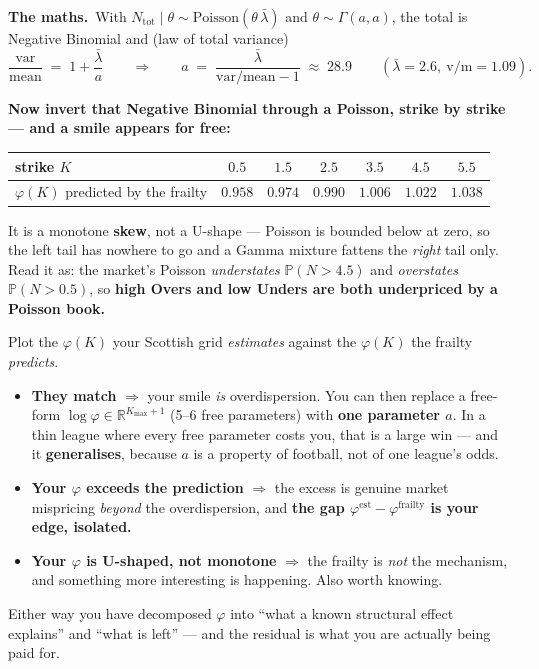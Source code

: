 \documentclass[11pt,a4paper]{article}
\newcommand{\formula}[1]{\smallskip\noindent\textbf{\small The maths.}\ #1}
\begin{document}
\formula{With $N_{\text{tot}} \mid \theta \sim \mathrm{Poisson}(\theta\,\bar\lambda)$ and
$\theta \sim \Gamma(a,a)$, the total is Negative Binomial and (law of total variance)
\[
  \frac{\mathrm{var}}{\mathrm{mean}} \;=\; 1 + \frac{\bar\lambda}{a}
  \qquad\Longrightarrow\qquad
  a \;=\; \frac{\bar\lambda}{\mathrm{var}/\mathrm{mean} - 1} \;\approx\; 28.9
  \qquad (\bar\lambda = 2.6,\ \mathrm{v/m} = 1.09).
\]}

\noindent
\textbf{Now invert that Negative Binomial through a Poisson, strike by strike --- and a smile appears for
free:}

\begin{center}
\begin{tabular}{@{}lcccccc@{}}
\toprule
strike $K$ & $0.5$ & $1.5$ & $2.5$ & $3.5$ & $4.5$ & $5.5$ \\
\midrule
$\varphi(K)$ predicted by the frailty & $0.958$ & $0.974$ & $0.990$ & $1.006$ & $1.022$ & $\mathbf{1.038}$ \\
\bottomrule
\end{tabular}
\end{center}

\noindent
It is a monotone \textbf{skew}, not a U-shape --- Poisson is bounded below at zero, so the left tail has
nowhere to go and a Gamma mixture fattens the \emph{right} tail only. Read it as: the market's Poisson
\emph{understates} $\mathbb{P}(N > 4.5)$ and \emph{overstates} $\mathbb{P}(N > 0.5)$, so \textbf{high Overs
and low Unders are both underpriced by a Poisson book.}

\begin{partialbox}[title={THE TEST THAT MATTERS --- one plot, and it is cheap}]
Plot the $\varphi(K)$ your Scottish grid \emph{estimates} against the $\varphi(K)$ the frailty
\emph{predicts}.

\begin{itemize}
\item \textbf{They match} $\Rightarrow$ your smile \emph{is} overdispersion. You can then replace a free-form
      $\log\varphi \in \mathbb{R}^{K_{\max}+1}$ (5--6 free parameters) with \textbf{one parameter $a$}. In a
      thin league where every free parameter costs you, that is a large win --- and it \textbf{generalises},
      because $a$ is a property of football, not of one league's odds.
\item \textbf{Your $\varphi$ exceeds the prediction} $\Rightarrow$ the excess is genuine market mispricing
      \emph{beyond} the overdispersion, and \textbf{the gap
      $\varphi^{\text{est}} - \varphi^{\text{frailty}}$ is your edge, isolated.}
\item \textbf{Your $\varphi$ is U-shaped, not monotone} $\Rightarrow$ the frailty is \emph{not} the
      mechanism, and something more interesting is happening. Also worth knowing.
\end{itemize}
Either way you have decomposed $\varphi$ into ``what a known structural effect explains'' and ``what is
left'' --- and the residual is what you are actually being paid for.
\end{partialbox}
\end{document}
